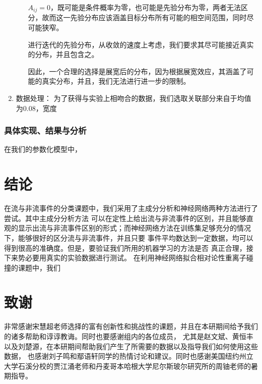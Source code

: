 \documentclass[aps,pre,12pt,preprint,onecolumn,showpacs,showkeys]{revtex4-1}
\begin{document}
\begin{enumerate}
\begin{enumerate}
        $A_{ij}=0$，既可能是条件概率为零，也可能是先验分布为零，两者无法区分，故而这一先验分布应该涵盖目标分布所有可能的相空间范围，同时尽可能狭窄。\par
        进行迭代的先验分布，从收敛的速度上考虑，我们要求其尽可能接近真实的分布，并且包含之。\par
        因此，一个合理的选择是展宽后的分布，因为根据展宽效应，其涵盖了可能的真实分布，并且，我们无法进行进一步的限制。
    \end{enumerate}
    \item 数据处理：
    为了获得与实验上相吻合的数据，我们选取关联部分来自于均值为$0.08$，宽度
\end{enumerate}
\subsubsection{具体实现、结果与分析}
在我们的参数化模型中，


\section{结论}
在流与非流事件的分类课题中，我们采用了主成分分析和神经网络两种方法进行了尝试。其中主成分分析方法
可以在定性上给出流与非流事件的区别，并且能够直观的显示出流与非流事件区别的形式；而神经网络方法在训练集足够充分的情况下，能够很好的区分流与非流事件，并且只要
事件平均数达到一定数据，均可以得到很高的准确度。但是，要验证我们所用的机器学习的方法是否
真正合理，接下来势必要用真实的实验数据进行测试。
在利用神经网络拟合相对论性重离子碰撞的课题中，我们

\section{致谢}
非常感谢宋慧超老师选择的富有创新性和挑战性的课题，并且在本研期间给予我们的诸多帮助和谆谆教诲。同时也要感谢组内的各位成员，
尤其是赵文斌、黄恒丰以及刘楚源，在本研期间帮助我们产生了所需要的数据以及指导我们如何使用这些数据，
也感谢刘子鸣和鄢语轩同学的热情讨论和建议。同时也感谢美国纽约州立大学石溪分校的贾江涌老师和丹麦哥本哈根大学尼尔斯玻尔研究所的周铀老师的暑期指导。



%
%
%
%
%
%
%
%
%
%
%
%
%
%
%
\end{document}
